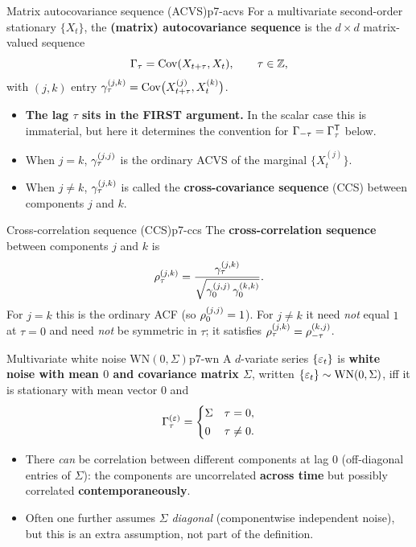\begin{definition}{Matrix autocovariance sequence (ACVS)}{p7-acvs}
For a multivariate second-order stationary $\{X_t\}$, the
\textbf{(matrix) autocovariance sequence} is the $d\times d$ matrix-valued
sequence
\[
\Gamma_\tau=\operatorname{Cov}(X_{t+\tau},X_t),\qquad \tau\in\mathbb{Z} ,
\]
with $(j,k)$ entry $\gamma_\tau^{(j,k)}=\operatorname{Cov}\!\big(X_{t+\tau}^{(j)},X_t^{(k)}\big)$.
\begin{itemize}
  \item \textbf{The lag $\tau$ sits in the FIRST argument.} In the scalar case
        this is immaterial, but here it determines the convention for
        $\Gamma_{-\tau}=\Gamma_\tau^{\mathsf{T}}$ below.
  \item When $j=k$, $\gamma_\tau^{(j,j)}$ is the ordinary ACVS of the marginal
        $\{X_t^{(j)}\}$.
  \item When $j\ne k$, $\gamma_\tau^{(j,k)}$ is called the
        \textbf{cross-covariance sequence} (CCS) between components $j$ and $k$.
\end{itemize}
\end{definition}

\begin{definition}{Cross-correlation sequence (CCS)}{p7-ccs}
The \textbf{cross-correlation sequence} between components $j$ and $k$ is
\[
\rho_\tau^{(j,k)}
=\frac{\gamma_\tau^{(j,k)}}{\sqrt{\gamma_0^{(j,j)}\,\gamma_0^{(k,k)}}} .
\]
For $j=k$ this is the ordinary ACF (so $\rho_0^{(j,j)}=1$). For $j\ne k$ it need
\emph{not} equal $1$ at $\tau=0$ and need \emph{not} be symmetric in $\tau$; it
satisfies $\rho_\tau^{(j,k)}=\rho_{-\tau}^{(k,j)}$.
\end{definition}

\begin{definition}{Multivariate white noise $\mathrm{WN}(0,\Sigma)$}{p7-wn}
A $d$-variate series $\{\varepsilon_t\}$ is \textbf{white noise with mean $0$ and
covariance matrix $\Sigma$}, written $\{\varepsilon_t\}\sim\mathrm{WN}(0,\Sigma)$, iff
it is stationary with mean vector $0$ and
\[
\Gamma_\tau^{(\varepsilon)}=
\begin{cases}\Sigma & \tau=0,\\[2pt] 0 & \tau\ne0.\end{cases}
\]
\begin{itemize}
  \item There \emph{can} be correlation between different components at lag $0$
        (off-diagonal entries of $\Sigma$): the components are uncorrelated
        \textbf{across time} but possibly correlated \textbf{contemporaneously}.
  \item Often one further assumes $\Sigma$ \emph{diagonal} (componentwise
        independent noise), but this is an extra assumption, not part of the
        definition.
\end{itemize}
\end{definition}

